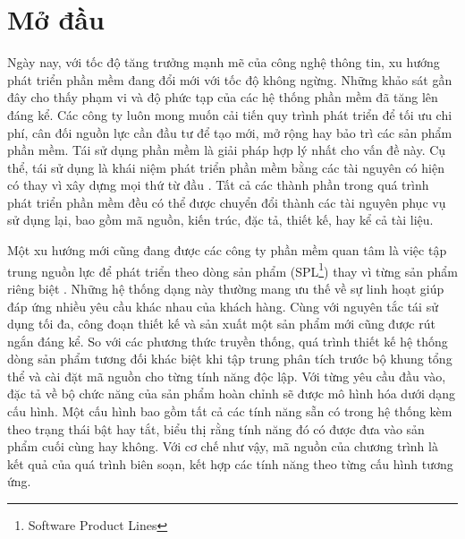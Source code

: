 \chapter*{Mở đầu}
\setcounter{page}{1}
Ngày nay, với tốc độ tăng trưởng mạnh mẽ của công nghệ thông tin, xu hướng phát triển phần mềm đang đổi mới với tốc độ không ngừng. Những khảo sát gần đây cho thấy phạm vi và độ phức tạp của các hệ thống phần mềm đã tăng lên đáng kể. Các công ty luôn mong muốn cải tiến quy trình phát triển để tối ưu chi phí, cân đối nguồn lực cần đầu tư để tạo mới, mở rộng hay bảo trì các sản phẩm phần mềm. Tái sử dụng phần mềm là giải pháp hợp lý nhất cho vấn đề này. Cụ thể, tái sử dụng là khái niệm phát triển phần mềm bằng các tài nguyên có hiện có thay vì xây dựng mọi thứ từ đầu \cite{Krueger}. Tất cả các thành phần trong quá trình phát triển phần mềm đều có thể được chuyển đổi thành các tài nguyên phục vụ sử dụng lại, bao gồm mã nguồn, kiến trúc, đặc tả, thiết kế, hay kể cả tài liệu. \par
Một xu hướng mới cũng đang được các công ty phần mềm quan tâm là việc tập trung nguồn lực để phát triển theo dòng sản phẩm (SPL\footnote{Software Product Lines}) thay vì từng sản phẩm riêng biệt \cite{Guendouz2014}. Những hệ thống dạng này thường mang ưu thế về sự linh hoạt giúp đáp ứng nhiều yêu cầu khác nhau của khách hàng. Cùng với nguyên tắc tái sử dụng tối đa, công đoạn thiết kế và sản xuất một sản phẩm mới cũng được rút ngắn đáng kể. So với các phương thức truyền thống, quá trình thiết kế hệ thống dòng sản phẩm tương đối khác biệt khi tập trung phân tích trước bộ khung tổng thể và cài đặt mã nguồn cho từng tính năng độc lập. Với từng yêu cầu đầu vào, đặc tả về bộ chức năng của sản phẩm hoàn chỉnh sẽ được mô hình hóa dưới dạng cấu hình. Một cấu hình bao gồm tất cả các tính năng sẵn có trong hệ thống kèm theo trạng thái bật hay tắt, biểu thị rằng tính năng đó có được đưa vào sản phẩm cuối cùng hay không. Với cơ chế như vậy, mã nguồn của chương trình là kết quả của quá trình biên soạn, kết hợp các tính năng theo từng cấu hình tương ứng. \par
